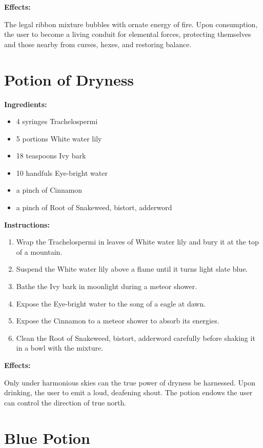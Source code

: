 \documentclass{article}
\begin{document}
\textbf{Effects:}

The legal ribbon mixture bubbles with ornate energy of fire. Upon consumption, the user to become a living conduit for elemental forces, protecting themselves and those nearby from curses, hexes, and restoring balance.

\newpage
\section*{Potion of Dryness}

\textbf{Ingredients:}

\begin{itemize}
  \item 4 syringes Trachelospermi
  \item 5 portions White water lily
  \item 18 teaspoons Ivy bark
  \item 10 handfuls Eye-bright water
  \item a pinch of Cinnamon
  \item a pinch of Root of Snakeweed, bistort, adderword
\end{itemize}

\textbf{Instructions:}

\begin{enumerate}
  \item Wrap the Trachelospermi in leaves of White water lily and bury it at the top of a mountain.
  \item Suspend the White water lily above a flame until it turns light slate blue.
  \item Bathe the Ivy bark in moonlight during a meteor shower.
  \item Expose the Eye-bright water to the song of a eagle at dawn.
  \item Expose the Cinnamon to a meteor shower to absorb its energies.
  \item Clean the Root of Snakeweed, bistort, adderword carefully before shaking it in a bowl with the mixture.
\end{enumerate}

\textbf{Effects:}

Only under harmonious skies can the true power of dryness be harnessed. Upon drinking, the user to emit a loud, deafening shout. The potion endows the user can control the direction of true north.

\newpage
\section*{Blue Potion}
\end{document}

